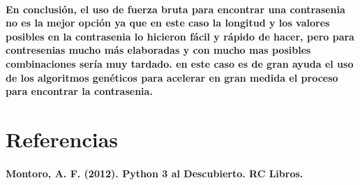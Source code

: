 \documentclass[10pt,a4paper]{article}
\begin{document}
\paragraph{En conclusi\'on, el uso de fuerza bruta para encontrar una contrasenia no es la mejor opci\'on ya que en este caso la longitud y los valores posibles en la contrasenia lo hicieron f\'acil y r\'apido de hacer, pero para contresenias mucho m\'as elaboradas y con mucho mas posibles combinaciones ser\'ia muy tardado. en este caso es de gran ayuda el uso de los algoritmos gen\'eticos para acelerar en gran medida el proceso para encontrar la contrasenia.}
\section{Referencias}
\paragraph{Montoro, A. F. (2012). Python 3 al Descubierto. RC Libros.}
\end{document}
